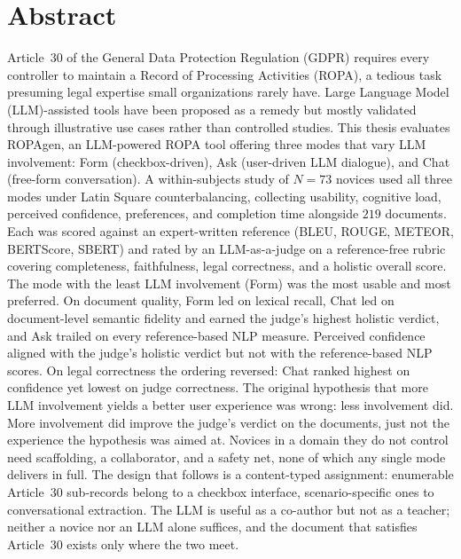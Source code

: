 \chapter*{Abstract}

Article~30 of the General Data Protection Regulation (GDPR) requires every controller to maintain a Record of Processing Activities (ROPA),
a tedious task presuming legal expertise small organizations rarely have.
Large Language Model (LLM)-assisted tools have been proposed as a remedy but mostly validated through illustrative use cases rather than controlled studies.
This thesis evaluates ROPAgen, an LLM-powered ROPA tool offering three modes that vary LLM involvement:
Form (checkbox-driven), Ask (user-driven LLM dialogue), and Chat (free-form conversation).
A within-subjects study of $N = 73$ novices used all three modes under Latin Square counterbalancing,
collecting usability, cognitive load, perceived confidence, preferences, and completion time alongside $219$ documents.
Each was scored against an expert-written reference (BLEU, ROUGE, METEOR, BERTScore, SBERT)
and rated by an LLM-as-a-judge on a reference-free rubric covering completeness, faithfulness, legal correctness, and a holistic overall score.
The mode with the least LLM involvement (Form) was the most usable and most preferred.
On document quality, Form led on lexical recall, Chat led on document-level semantic fidelity
and earned the judge's highest holistic verdict, and Ask trailed on every reference-based NLP measure.
Perceived confidence aligned with the judge's holistic verdict but not with the reference-based NLP scores.
On legal correctness the ordering reversed: Chat ranked highest on confidence yet lowest on judge correctness.
The original hypothesis that more LLM involvement yields a better user experience was wrong: less involvement did. More involvement did improve the judge's verdict on the documents, just not the experience the hypothesis was aimed at.
Novices in a domain they do not control need scaffolding, a collaborator, and a safety net, none of which any single mode delivers in full.
The design that follows is a content-typed assignment: enumerable Article~30 sub-records belong to a checkbox interface, scenario-specific ones to conversational extraction.
The LLM is useful as a co-author but not as a teacher; neither a novice nor an LLM alone suffices, and the document that satisfies Article~30 exists only where the two meet.
